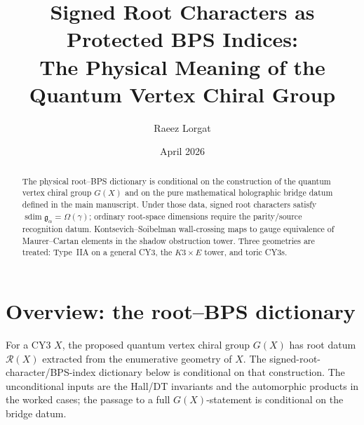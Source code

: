 \documentclass[11pt]{article}
\title{Signed Root Characters as Protected BPS Indices:\\
 The Physical Meaning of the Quantum Vertex Chiral Group}
\author{Raeez Lorgat}
\date{April 2026}
\theoremstyle{definition}
\newcommand{\sdim}{\operatorname{sdim}}
\begin{document}
\maketitle

\begin{abstract}
The physical root--BPS dictionary is conditional on the construction of
the quantum vertex chiral group $G(X)$ and on the pure mathematical
holographic bridge datum defined in the main manuscript.
Under those data, signed root characters satisfy
\(\sdim\mathfrak g_\alpha=\Omega(\gamma)\); ordinary root-space
dimensions require the parity/source recognition datum. Kontsevich--Soibelman
wall-crossing maps to gauge equivalence of Maurer--Cartan elements in the
shadow obstruction tower. Three geometries are treated: Type~IIA on a
general CY3, the $K3 \times E$ tower, and toric CY3s.
\end{abstract}

\tableofcontents

\section{Overview: the root--BPS dictionary}
\label{sec:overview}

For a CY3 $X$, the proposed quantum vertex chiral group $G(X)$ has root
datum $\mathcal{R}(X)$ extracted from the enumerative geometry of $X$.
The signed-root-character/BPS-index dictionary below is conditional on
that construction. The unconditional inputs are the Hall/DT invariants and the
automorphic products in the worked cases; the passage to a full
$G(X)$-statement is conditional on the bridge datum.
\end{document}
